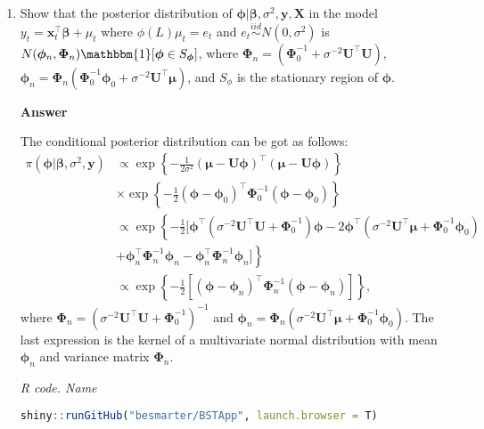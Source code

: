 \begin{enumerate}[leftmargin=*]
\item Show that the posterior distribution of $\bm{\phi}|\bm{\beta},\sigma^2,\bm{y},\bm{X}$ in the model $y_t=\bm{x}_t^{\top}\bm{\beta}+\mu_t$ where $\phi(L)\mu_t=e_t$ and $e_t\stackrel{iid}{\sim}N(0,\sigma^2)$ is $N(\bm{\phi}_n, \bm{\Phi}_n)\mathbbm{1}[\bm{\phi}\in S_{\bm{\phi}}]$, where $\bm{\Phi}_n=(\bm{\Phi}_0^{-1}+\sigma^{-2}\bm{U}^{\top}\bm{U})$, $\bm{\phi}_n=\bm{\Phi}_n(\bm{\Phi}_0^{-1}\bm{\phi}_0+\sigma^{-2}\bm{U}^{\top}\bm{\mu})$, and $S_{\phi}$ is the stationary region of $\bm{\phi}$.
	
\textbf{Answer}
	
The conditional posterior distribution can be got as follows:
	\begin{align*}
		\pi(\bm{\phi}|\bm{\beta},\sigma^2,\bm{y})&\propto \exp\left\{-\frac{1}{2\sigma^2}(\bm{\mu}-\bm{U}\bm{\phi})^{\top}(\bm{\mu}-\bm{U}\bm{\phi})\right\}\\
		&\times \exp\left\{-\frac{1}{2}(\bm{\phi}-\bm{\phi}_0)^{\top}\bm{\Phi}_0^{-1}(\bm{\phi}-\bm{\phi}_0)\right\}\\
		&\propto\exp\left\{-\frac{1}{2}[\bm{\phi}^{\top}(\sigma^{-2}\bm{U}^{\top}\bm{U}+\bm{\Phi}_0^{-1})\bm{\phi}-2\bm{\phi}^{\top}(\sigma^{-2}\bm{U}^{\top}\bm{\mu}+\bm{\Phi}_0^{-1}\bm{\phi}_0)\right.\\
		&\left.+\bm{\phi}_n^{\top}\bm{\Phi}_n^{-1}\bm{\phi}_n-\bm{\phi}_n^{\top}\bm{\Phi}_n^{-1}\bm{\phi}_n]\right\}\\
		&\propto\exp\left\{-\frac{1}{2}[(\bm{\phi}-\bm{\phi}_n)^{\top}\bm{\Phi}_n^{-1}(\bm{\phi}-\bm{\phi}_n)]\right\}, 
	\end{align*}
where $\bm{\Phi}_n=(\sigma^{-2}\bm{U}^{\top}\bm{U}+\bm{\Phi}_0^{-1})^{-1}$ and $\bm{\phi}_n=\bm{\Phi}_n(\sigma^{-2}\bm{U}^{\top}\bm{\mu}+\bm{\Phi}_0^{-1}\bm{\phi}_0)$. The last expression is the kernel of a multivariate normal distribution with mean $\bm{\phi}_n$ and variance matrix $\bm{\Phi}_n$.   
	
	\begin{tcolorbox}[enhanced,width=4.67in,center upper,
		fontupper=\large\bfseries,drop shadow southwest,sharp corners]
		\textit{R code. Name}
		\begin{VF}
			\begin{lstlisting}[language=R]
	shiny::runGitHub("besmarter/BSTApp", launch.browser = T)\end{lstlisting}
		\end{VF}
	\end{tcolorbox} 
	
\end{enumerate}